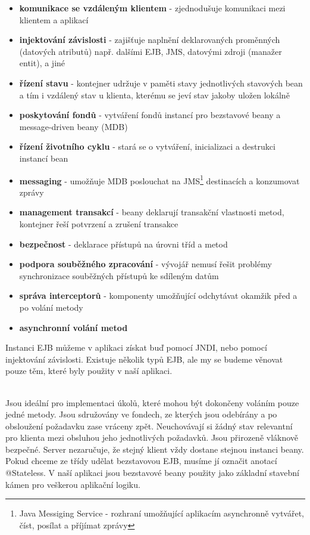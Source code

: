 \documentclass[122pt,oneside]{fithesis}
\begin{document}
\begin{itemize}
  \item {\bf komunikace se vzdáleným klientem} - zjednodušuje komunikaci mezi klientem a aplikací
  \item {\bf injektování závislosti} - zajišťuje naplnění deklarovaných proměnných (datových atributů) např. dalšími EJB, JMS, datovými zdroji (manažer entit), a jiné
  \item {\bf řízení stavu} - kontejner udržuje v paměti stavy jednotlivých stavových bean a tím i vzdálený stav u klienta, kterému se jeví stav jakoby uložen lokálně
  \item {\bf poskytování fondů} - vytváření fondů instancí pro bezstavové beany a message-driven beany (MDB)
  \item {\bf řízení životního cyklu} - stará se o vytváření, inicializaci a destrukci instancí bean
  \item {\bf messaging} - umožňuje MDB poslouchat na JMS\footnote[1]{Java Messiging Service - rozhraní umožňující aplikacím asynchronně vytvářet, číst, posílat a příjímat zprávy} destinacích a konzumovat zprávy
  \item {\bf management transakcí} - beany deklarují transakční vlastnosti metod, kontejner řeší potvrzení a zrušení transakce
  \item {\bf bezpečnost} - deklarace přístupů na úrovni tříd a metod
  \item {\bf podpora souběžného zpracování} - vývojář nemusí řešit problémy synchronizace souběžných přístupů ke sdíleným datům
  \item {\bf správa interceptorů} - komponenty umožňující odchytávat okamžik před a po volání metody
  \item {\bf asynchronní volání metod} 
\end{itemize}

Instanci EJB můžeme v aplikaci získat buď pomocí JNDI, nebo pomocí injektování závislosti.
Existuje několik typů EJB, ale my se budeme věnovat pouze těm, které byly použity v naší aplikaci.

\vspace{5 mm}
\\\indent Jsou ideální pro implementaci úkolů, které mohou být dokončeny voláním pouze jedné metody. Jsou sdružovány ve fondech, ze kterých jsou odebírány a po obsloužení požadavku zase vráceny zpět. Neuchovávají si žádný stav relevantní pro klienta mezi obsluhou jeho jednotlivých požadavků. Jsou přirozeně vláknově bezpečné. Server nezaručuje, že stejný klient vždy dostane stejnou instanci beany. Pokud chceme ze třídy udělat bezstavovou EJB, musíme jí označit anotací @Stateless. V naší aplikaci jsou bezstavové beany použity jako základní stavební kámen pro veškerou aplikační logiku.
\end{document}
